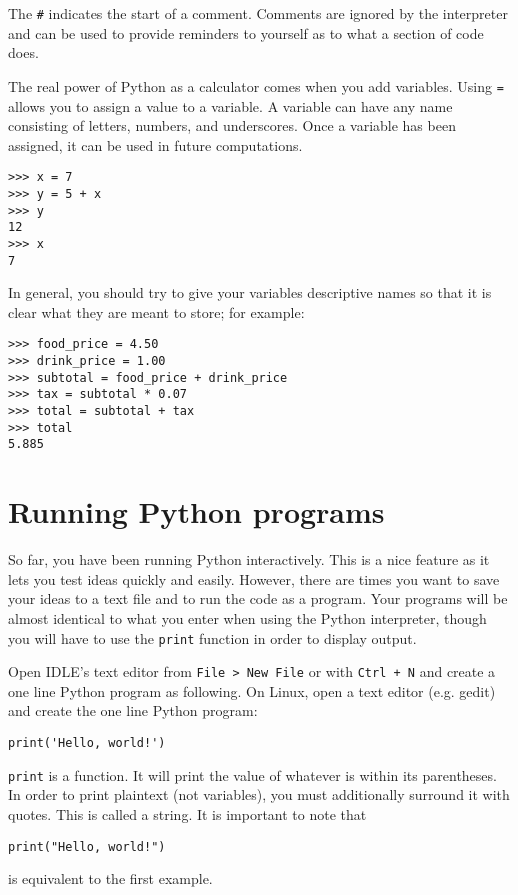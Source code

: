 \documentclass[12pt,hidelinks]{article}
\begin{document}
The \texttt{\#} indicates the start of a comment. Comments are ignored by the
interpreter and can be used to provide reminders to yourself as to what a
section of code does.

The real power of Python as a calculator comes when you add variables. Using
\texttt{=} allows you to assign a value to a variable. A variable can have any
name consisting of letters, numbers, and underscores. Once a variable has been
assigned, it can be used in future computations.

\begin{lstlisting}[style=bash]
>>> x = 7
>>> y = 5 + x
>>> y
12
>>> x
7
\end{lstlisting}

In general, you should try to give your variables descriptive names so that it is
clear what they are meant to store; for example:

\begin{lstlisting}[style=bash]
>>> food_price = 4.50
>>> drink_price = 1.00
>>> subtotal = food_price + drink_price
>>> tax = subtotal * 0.07
>>> total = subtotal + tax
>>> total
5.885
\end{lstlisting}

\pagebreak
\section{Running Python programs} 

So far, you have been running Python interactively. This is a nice feature as it
lets you test ideas quickly and easily. However, there are times you want to
save your ideas to a text file and to run the code as a program. Your programs
will be almost identical to what you enter when using the Python interpreter,
though you will have to use the \texttt{print} function in order to display
output.

Open IDLE's text editor from \texttt{File > New File} or with \texttt{Ctrl + N}
and create a one line Python program as following. On Linux, open a text editor
(e.g. gedit) and create the one line Python program:
\begin{lstlisting}[style=python]
print('Hello, world!')
\end{lstlisting}

\texttt{print} is a function. It will print the value of whatever is within its
parentheses. In order to print plaintext (not variables), you must additionally
surround it with quotes. This is called a string. It is important to note that
\begin{lstlisting}[style=python]
print("Hello, world!")
\end{lstlisting}
is equivalent to the first example.
\end{document}
